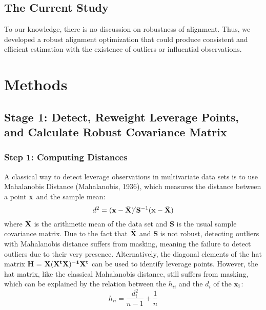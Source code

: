 \documentclass[
  man]{apa7}
\begin{document}
\subsection{The Current Study}\label{the-current-study}

To our knowledge, there is no discussion on robustness of alignment. Thus, we developed a robust alignment optimization that could produce consistent and efficient estimation with the existence of outliers or influential observations.

\section{Methods}\label{methods}

\subsection{Stage 1: Detect, Reweight Leverage Points, and Calculate Robust Covariance Matrix}\label{stage-1-detect-reweight-leverage-points-and-calculate-robust-covariance-matrix}

\subsubsection{Step 1: Computing Distances}\label{step-1-computing-distances}

A classical way to detect leverage observations in multivariate data sets is to use Mahalanobis Distance (Mahalanobis, 1936), which measures the distance between a point \({\bf x}\) and the sample mean:
\begin{equation}
d^{2} = ({\bf x}-\bar{\bf X})'{\bf S}^{-1}({\bf x}-\bar{\bf X})
\end{equation}
where \(\bar{\bf X}\) is the arithmetic mean of the data set and \(\textbf{S}\) is the usual sample covariance matrix. Due to the fact that \(\bar{\bf X}\) and \(\textbf{S}\) is not robust, detecting outliers with Mahalanobis distance suffers from masking, meaning the failure to detect outliers due to their very presence. Alternatively, the diagonal elements of the hat matrix \(\textbf{H}\) = \(\bf X(\bf X^{t}X)^{-1}X^{t}\) can be used to identify leverage points. However, the hat matrix, like the classical Mahalanobis distance, still suffers from masking, which can be explained by the relation between the \(h_{ii}\) and the \(d_{i}\) of the \(\bf {x_{i}}\):
\begin{equation}
h_{ii} = \frac{d_{i}^{2}}{n-1} + \frac{1}{n}
\end{equation}
\end{document}
